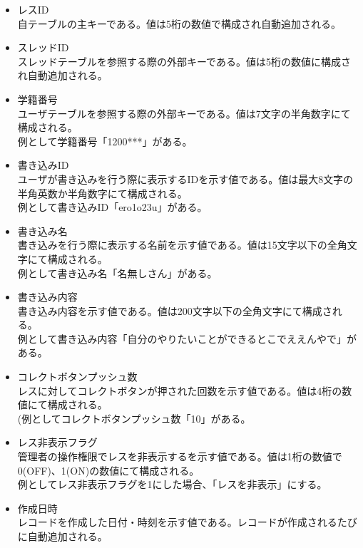 \documentclass[a4j]{jarticle}
\begin{document}
  \begin{itemize}
  \item レスID\\
    自テーブルの主キーである。値は5桁の数値で構成され自動追加される。
  \item スレッドID\\
    スレッドテーブルを参照する際の外部キーである。値は5桁の数値に構成され自動追加される。
  \item 学籍番号\\
    ユーザテーブルを参照する際の外部キーである。値は7文字の半角数字にて構成される。\\
      例として学籍番号「1200***」がある。
  \item 書き込みID\\
    ユーザが書き込みを行う際に表示するIDを示す値である。値は最大8文字の半角英数か半角数字にて構成される。\\
    例として書き込みID「ero1o23u」がある。
  \item 書き込み名\\
    書き込みを行う際に表示する名前を示す値である。値は15文字以下の全角文字にて構成される。\\
    例として書き込み名「名無しさん」がある。
  \item 書き込み内容\\
    書き込み内容を示す値である。値は200文字以下の全角文字にて構成される。\\
    例として書き込み内容「自分のやりたいことができるとこでええんやで」がある。
  \item コレクトボタンプッシュ数\\
    レスに対してコレクトボタンが押された回数を示す値である。値は4桁の数値にて構成される。\\(例としてコレクトボタンプッシュ数「10」がある。
  \item レス非表示フラグ\\
    管理者の操作権限でレスを非表示するを示す値である。値は1桁の数値で0(OFF)、1(ON)の数値にて構成される。\\
    例としてレス非表示フラグを1にした場合、「レスを非表示」にする。
  \item 作成日時\\
    レコードを作成した日付・時刻を示す値である。レコードが作成されるたびに自動追加される。
  \end{itemize}
\end{document}
